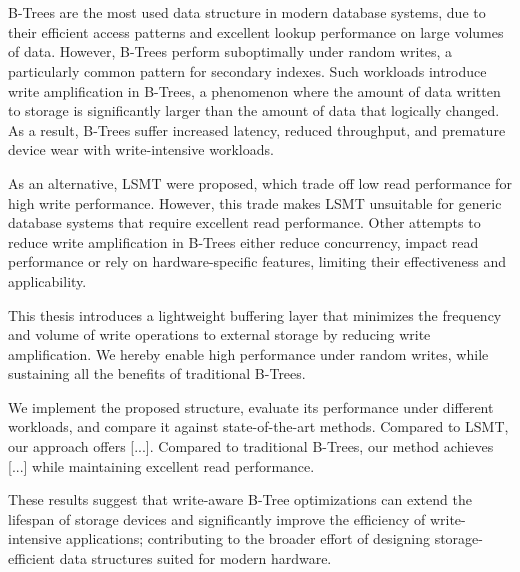 \chapter{\abstractname}

B-Trees are the most used data structure in modern database systems, due to their efficient access patterns and excellent lookup performance on large volumes of data.
However, B-Trees perform suboptimally under random writes, a particularly common pattern for secondary indexes.
Such workloads introduce write amplification in B-Trees, a phenomenon where the amount of data written to storage is significantly larger than the amount of data that logically changed.
As a result, B-Trees suffer increased latency, reduced throughput, and premature device wear with write-intensive workloads.

As an alternative, \ac{LSMT} were proposed, which trade off low read performance for high write performance.
However, this trade makes \ac{LSMT} unsuitable for generic database systems that require excellent read performance.
Other attempts to reduce write amplification in B-Trees either reduce concurrency, impact read performance or rely on hardware-specific features, limiting their effectiveness and applicability.

This thesis introduces a lightweight buffering layer that minimizes the frequency and volume of write operations to external storage by reducing write amplification.
We hereby enable high performance under random writes, while sustaining all the benefits of traditional B-Trees.

We implement the proposed structure, evaluate its performance under different workloads, and compare it against state-of-the-art methods.
Compared to \ac{LSMT}, our approach offers [...].
Compared to traditional B-Trees, our method achieves [...] while maintaining excellent read performance.

These results suggest that write-aware B-Tree optimizations can extend the lifespan of storage devices and significantly improve the efficiency of write-intensive applications; contributing to the broader effort of designing storage-efficient data structures suited for modern hardware.